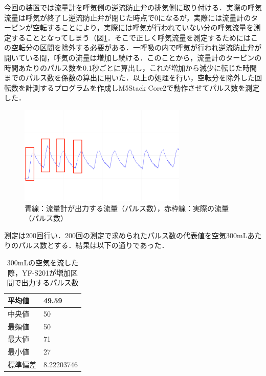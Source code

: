 今回の装置では流量計を呼気側の逆流防止弁の排気側に取り付ける．実際の呼気流量は呼気が終了し逆流防止弁が閉じた時点で0になるが，実際には流量計のタービンが空転することにより，実際には呼気が行われていない分の呼気流量を測定することとなってしまう（図\ref{fig:flowsensor_increased_section}．そこで正しく呼気流量を測定するためにはこの空転分の区間を除外する必要がある．一呼吸の内で呼気が行われ逆流防止弁が開いている間，呼気の流量は増加し続ける．このことから，流量計のタービンの時間あたりのパルス数を0.1秒ごとに算出し，これが増加から減少に転じた時間までのパルス数を係数の算出に用いた．以上の処理を行い，空転分を除外した回転数を計測するプログラムを作成しM5Stack Core2で動作させてパルス数を測定した．

\begin{figure}[H]
  \begin{center}
    \includegraphics[width=8cm]{fig/flowsensor_increased_section}
    \caption{青線：流量計が出力する流量（パルス数），赤枠線：実際の流量（パルス数）}
    \label{fig:flowsensor_increased_section}
  \end{center}
\end{figure}

測定は200回行い．200回の測定で求められたパルス数の代表値を空気300mLあたりのパルス数とする．結果は以下の通りであった．

\begin{table}[H]
\begin{center}
\caption{300mLの空気を流した際，YF-S201が増加区間で出力するパルス数}
\label{tb:flowsensor_result}
\begin{tabular}{|l|l|}
\hline
平均値  & 49.59      \\ \hline
中央値  & 50         \\ \hline
最頻値  & 50         \\ \hline
最大値  & 71         \\ \hline
最小値  & 27         \\ \hline
標準偏差 & 8.22203746 \\ \hline
\end{tabular}
\end{center}
\end{table}

